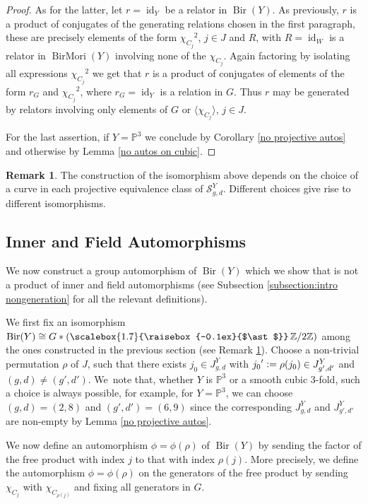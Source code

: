 \documentclass[JEP,XML,SOM,Unicode,published]{cedram}
\theoremstyle{plain}
\theoremstyle{definition}
\newtheorem{remark}[theorem]{Remark}
\newcommand\Bir{\operatorname{Bir}}
\newcommand\BirMori{\operatorname{BirMori}}
\newcommand\id{\operatorname{id}}
\newcommand{\ZZ}{\mathbb{Z}}
\newcommand{\PP}{\mathbb{P}}
\let\isom\cong
\newcommand{\defeq}{\vcentcolon=}
\newcommand{\freeprod}{\mathop{\scalebox{1.7}{\raisebox{-0.1ex}{$\ast$}}}}
\begin{document}
\begin{proof}
As for the latter, let $r = \id_Y$ be a relator in $\Bir(Y)$.
As previously, $r$ is a product of conjugates of the generating relations chosen in the first paragraph, these are precisely elements of the form ${\chi_{C_j}}^2$, $j\in J$ and $R$, with $R = \id_W$ is a relator in $\BirMori(Y)$ involving none of the $\chi_{C_j}$.
Again factoring by isolating all expressions ${\chi_{C_j}}^2$ we get that $r$ is a product of conjugates of elements of the form $r_G$ and ${\chi_{C_j}}^2$, where $r_G = \id_Y$ is a relation in $G$.
Thus $r$ may be generated by relators involving only elements of $G$ or $\langle \chi_{C_j} \rangle$, $j\in J$.

For the last assertion, if $Y = \PP^3$ we conclude by Corollary \ref{no projective autos} and otherwise by Lemma \ref{no autos on cubic}.
\end{proof}

\begin{remark}\label{many isos}
The construction of the isomorphism above depends on the choice of a curve in each projective equivalence class of $\mathcal{S}_{g,d}^Y$. Different choices give rise to different isomorphisms.
\end{remark}

\subsection{Inner and Field Automorphisms}\label{section:InnerAndFieldAutos}

We now construct a group automorphism of $\Bir(Y)$ which we show that is not a product of inner and field automorphisms (see Subsection \ref{subsection:intro nongeneration} for all the relevant definitions).

We first fix an isomorphism $\Bir(Y) \isom G \ast \left(\freeprod \ZZ/2\ZZ\right)$ among the ones constructed in the previous section (see Remark \ref{many isos}).
Choose a non-trivial permutation $\rho$ of $J$, such that there exists $j_0 \in J_{g,d}^Y$ with ${j_0}' \defeq \rho(j_0) \in J_{g',d'}^Y$ and $(g,d) \neq (g',d')$.
We~note that, whether $Y$ is $\PP^3$ or a smooth cubic $3$-fold, such a choice is always possible, for example, for $Y = \PP^3$, we can choose $(g,d)= (2,8)$ and $(g',d')=(6,9)$ since the corresponding $J_{g,d}^Y$ and $J_{g',d'}^Y$ are non-empty by Lemma \ref{no projective autos}.

We now define an automorphism $\phi = \phi(\rho)$ of $\Bir(Y)$ by sending the factor of the free product with index $j$ to that with index $\rho(j)$.
More precisely, we define the automorphism $\phi = \phi(\rho)$ on the generators of the free product by sending $\chi_{C_j}$ with $\chi_{C_{\rho(j)}}$ and fixing all generators in $G$.
\end{document}
